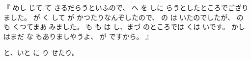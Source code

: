 『
めし
じて
て
さるだらうといふので、
へ
を
しに
らうとしたところでござりました。
が
く
して
が
かつたりなんぞしたので、
の
は
いたのでしたが、
の
も
くつてまあ
みました。
も
も
は
し、まづ
のところでは
くは
いです。
かし
はまだ
な
もありましやうよ、
が
ですから。
』

と、いと
に
り
せたり。
